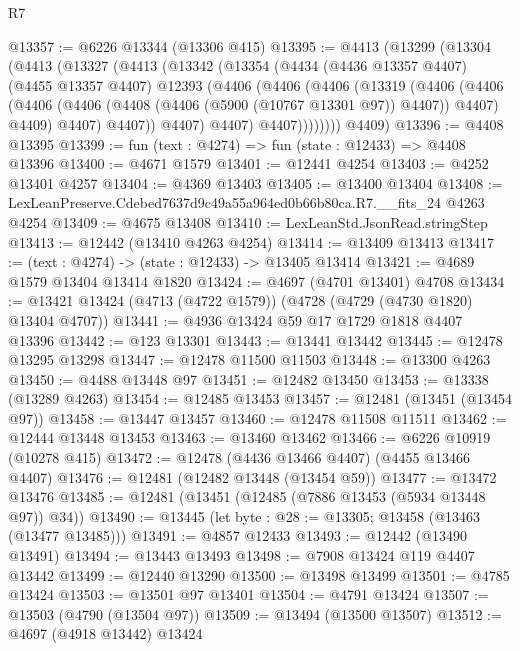 \begin{lexlean}{R7}
\begin{coremodule}
@13357 := @6226 @13344 (@13306 @415)
@13395 := @4413
    (@13299
      (@13304
        (@4413
          (@13327
            (@4413
              (@13342
                (@13354
                  (@4434
                    (@4436 @13357 @4407)
                    (@4455 @13357 @4407)
                    @12393
                    (@4406
                      (@4406
                        (@4406
                          (@13319
                            (@4406
                              (@4406
                                (@4406
                                  (@4406 (@4408 (@4406 (@5900 (@10767 @13301 @97)) @4407)) @4407)
                                  @4409)
                                @4407)
                              @4407))
                          @4407)
                        @4407)
                      @4407))))))))
      @4409)
@13396 := @4408 @13395
@13399 := fun (text : @4274) => fun (state : @12433) => @4408 @13396
@13400 := @4671 @1579
@13401 := @12441 @4254
@13403 := @4252 @13401 @4257
@13404 := @4369 @13403
@13405 := @13400 @13404
@13408 := LexLeanPreserve.Cdebed7637d9c49a55a964ed0b66b80ca.R7.__fits_24 @4263 @4254
@13409 := @4675 @13408
@13410 := LexLeanStd.JsonRead.stringStep
@13413 := @12442 (@13410 @4263 @4254)
@13414 := @13409 @13413
@13417 := (text : @4274) -> (state : @12433) -> @13405 @13414
@13421 := @4689 @1579 @13404 @13414 @1820
@13424 := @4697 (@4701 @13401) @4708
@13434 := @13421 @13424 (@4713 (@4722 @1579)) (@4728 (@4729 (@4730 @1820) @13404 @4707))
@13441 := @4936 @13424 @59 @17 @1729 @1818 @4407 @13396
@13442 := @123 @13301
@13443 := @13441 @13442
@13445 := @12478 @13295 @13298
@13447 := @12478 @11500 @11503
@13448 := @13300 @4263
@13450 := @4488 @13448 @97
@13451 := @12482 @13450
@13453 := @13338 (@13289 @4263)
@13454 := @12485 @13453
@13457 := @12481 (@13451 (@13454 @97))
@13458 := @13447 @13457
@13460 := @12478 @11508 @11511
@13462 := @12444 @13448 @13453
@13463 := @13460 @13462
@13466 := @6226 @10919 (@10278 @415)
@13472 := @12478 (@4436 @13466 @4407) (@4455 @13466 @4407)
@13476 := @12481 (@12482 @13448 (@13454 @59))
@13477 := @13472 @13476
@13485 := @12481 (@13451 (@12485 (@7886 @13453 (@5934 @13448 @97)) @34))
@13490 := @13445 (let byte : @28 := @13305; @13458 (@13463 (@13477 @13485)))
@13491 := @4857 @12433
@13493 := @12442 (@13490 @13491)
@13494 := @13443 @13493
@13498 := @7908 @13424 @119 @4407 @13442
@13499 := @12440 @13290
@13500 := @13498 @13499
@13501 := @4785 @13424
@13503 := @13501 @97 @13401
@13504 := @4791 @13424
@13507 := @13503 (@4790 (@13504 @97))
@13509 := @13494 (@13500 @13507)
@13512 := @4697 (@4918 @13442) @13424

\end{coremodule}
\end{lexlean}
